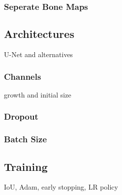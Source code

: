 \subsubsection{Seperate Bone Maps}

\subsection{Architectures}

U-Net and alternatives

\subsubsection{Channels}

growth and initial size

\subsubsection{Dropout}

\subsubsection{Batch Size}

\subsection{Training}

IoU, Adam, early stopping, LR policy

\newpage
